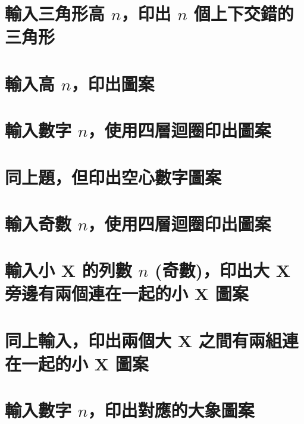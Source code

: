 \section{輸入三角形高 $n$，印出 $n$ 個上下交錯的三角形}


\section{輸入高 $n$，印出圖案}


\section{輸入數字 $n$，使用四層迴圈印出圖案}


\section{同上題，但印出空心數字圖案}


\section{輸入奇數 $n$，使用四層迴圈印出圖案}


\section{輸入小 X 的列數 $n$ (奇數)，印出大 X 旁邊有兩個連在一起的小 X 圖案}


\section{同上輸入，印出兩個大 X 之間有兩組連在一起的小 X 圖案}


\section{輸入數字 $n$，印出對應的大象圖案}


